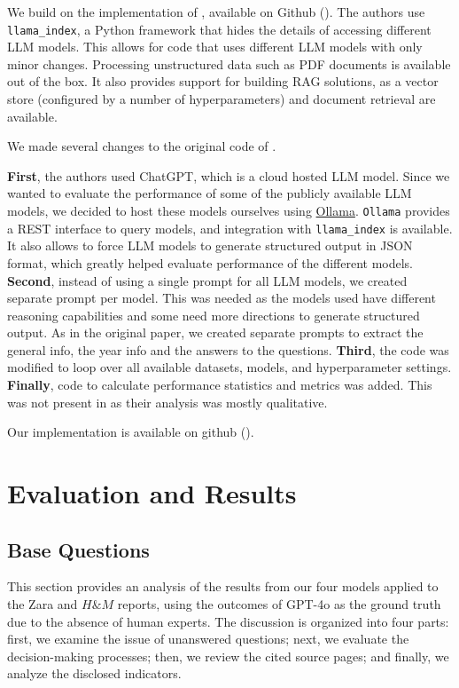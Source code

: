 \documentclass[]{article}
\begin{document}
We build on the implementation of \cite{durability}, available on Github (\cite{github-orig}).
The authors use \texttt{llama\_index}, a Python framework that hides the details of accessing different LLM models.
This allows for code that uses different LLM models with only minor changes.
Processing unstructured data such as PDF documents is available out of the box.
It also provides support for building RAG solutions, as a vector store (configured by a number of hyperparameters) and document retrieval are available.

We made several changes to the original code of \cite{durability}.

\textbf{First}, the authors used ChatGPT, which is a cloud hosted LLM model.
Since we wanted to evaluate the performance of some of the publicly available LLM models, we decided to host these models ourselves using \href{https://ollama.com/}{Ollama}.
\texttt{Ollama} provides a REST interface to query models, and integration with \texttt{llama\_index} is available.
It also allows to force LLM models to generate structured output in JSON format, which greatly helped evaluate performance of the different models.
\textbf{Second}, instead of using a single prompt for all LLM models, we created separate prompt per model.
This was needed as the models used have different reasoning capabilities and some need more directions to generate structured output.
As in the original paper, we created separate prompts to extract the general info, the year info and the answers to the questions.
\textbf{Third}, the code was modified to loop over all available datasets, models, and hyperparameter settings.
\textbf{Finally}, code to calculate performance statistics and metrics was added.
This was not present in \cite{durability} as their analysis was mostly qualitative.

Our implementation is available on github (\cite{github}).

\section{Evaluation and Results} \label{sec:evaluation}
\subsection{Base Questions}
This section provides an analysis of the results from our four models applied to the Zara and $H\&M$ reports, 
using the outcomes of GPT-4o as the ground truth due to the absence of human experts. 
The discussion is organized into four parts: first, we examine the issue of unanswered questions; 
next, we evaluate the decision-making processes; then, we review the cited source pages; and finally, 
we analyze the disclosed indicators.
\end{document}
